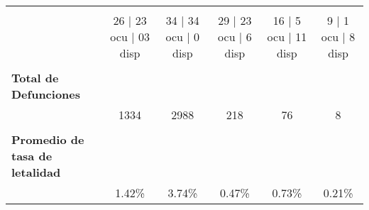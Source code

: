 \begin{tabular}{l|ccccc|}
	\multicolumn{1}{c|}{\cellcolor[HTML]{DDEBF7}} &
	\multicolumn{1}{c|}{\cellcolor[HTML]{E2EFDA}} &
	\cellcolor[HTML]{FFF2CC} \\ \cline{1-1}
	&
	\multicolumn{1}{c|}{\multirow{-3}{*}{\cellcolor[HTML]{FCE4D6}26 | 23 ocu |   03 disp}} &
	\multicolumn{1}{c|}{\multirow{-3}{*}{\cellcolor[HTML]{EDEDED}34 | 34 ocu | 0 disp}} &
	\multicolumn{1}{c|}{\multirow{-3}{*}{\cellcolor[HTML]{DDEBF7}29 | 23 ocu | 6 disp}} &
	\multicolumn{1}{c|}{\multirow{-3}{*}{\cellcolor[HTML]{E2EFDA}16 | 5 ocu | 11 disp}} &
	\multirow{-3}{*}{\cellcolor[HTML]{FFF2CC}9 | 1 ocu | 8 disp} \\ \cline{2-6} 
	\textbf{} &
	\multicolumn{1}{c|}{\cellcolor[HTML]{FCE4D6}} &
	\multicolumn{1}{c|}{\cellcolor[HTML]{EDEDED}} &
	\multicolumn{1}{c|}{\cellcolor[HTML]{DDEBF7}} &
	\multicolumn{1}{c|}{\cellcolor[HTML]{E2EFDA}} &
	\cellcolor[HTML]{FFF2CC} \\ \cline{1-1}
	\multicolumn{1}{|l|}{\textbf{Total de Defunciones}} &
	\multicolumn{1}{c|}{\cellcolor[HTML]{FCE4D6}} &
	\multicolumn{1}{c|}{\cellcolor[HTML]{EDEDED}} &
	\multicolumn{1}{c|}{\cellcolor[HTML]{DDEBF7}} &
	\multicolumn{1}{c|}{\cellcolor[HTML]{E2EFDA}} &
	\cellcolor[HTML]{FFF2CC} \\ \cline{1-1}
	&
	\multicolumn{1}{c|}{\multirow{-3}{*}{\cellcolor[HTML]{FCE4D6}1334}} &
	\multicolumn{1}{c|}{\multirow{-3}{*}{\cellcolor[HTML]{EDEDED}2988}} &
	\multicolumn{1}{c|}{\multirow{-3}{*}{\cellcolor[HTML]{DDEBF7}218}} &
	\multicolumn{1}{c|}{\multirow{-3}{*}{\cellcolor[HTML]{E2EFDA}76}} &
	\multirow{-3}{*}{\cellcolor[HTML]{FFF2CC}8} \\ \cline{2-6} 
	\textbf{} &
	\multicolumn{1}{c|}{\cellcolor[HTML]{FCE4D6}} &
	\multicolumn{1}{c|}{\cellcolor[HTML]{EDEDED}} &
	\multicolumn{1}{c|}{\cellcolor[HTML]{DDEBF7}} &
	\multicolumn{1}{c|}{\cellcolor[HTML]{E2EFDA}} &
	\cellcolor[HTML]{FFF2CC} \\ \cline{1-1}
	\multicolumn{1}{|l|}{\textbf{Promedio de tasa de letalidad}} &
	\multicolumn{1}{c|}{\cellcolor[HTML]{FCE4D6}} &
	\multicolumn{1}{c|}{\cellcolor[HTML]{EDEDED}} &
	\multicolumn{1}{c|}{\cellcolor[HTML]{DDEBF7}} &
	\multicolumn{1}{c|}{\cellcolor[HTML]{E2EFDA}} &
	\cellcolor[HTML]{FFF2CC} \\ \cline{1-1}
	&
	\multicolumn{1}{c|}{\multirow{-3}{*}{\cellcolor[HTML]{FCE4D6}1.42\%}} &
	\multicolumn{1}{c|}{\multirow{-3}{*}{\cellcolor[HTML]{EDEDED}3.74\%}} &
	\multicolumn{1}{c|}{\multirow{-3}{*}{\cellcolor[HTML]{DDEBF7}0.47\%}} &
	\multicolumn{1}{c|}{\multirow{-3}{*}{\cellcolor[HTML]{E2EFDA}0.73\%}} &
	\multirow{-3}{*}{\cellcolor[HTML]{FFF2CC}0.21\%} \\ \cline{2-6} 

\end{tabular}
